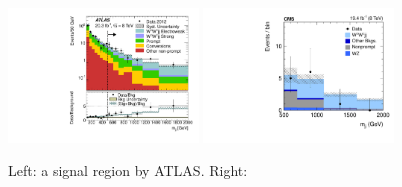 \begin{figure}[p]
    \centering
    \includegraphics[width=0.45\textwidth]{figures/ss-exclboson-ww-ss-atlas8tev.pdf}
    \includegraphics[width=0.45\textwidth]{figures/ss-exclboson-ww-ss-cms8tev.pdf}
    \caption{
    Left:  a signal region by ATLAS.
    Right:  }
    \label{fig:ss-exclboson-ww-ss}
\end{figure}
